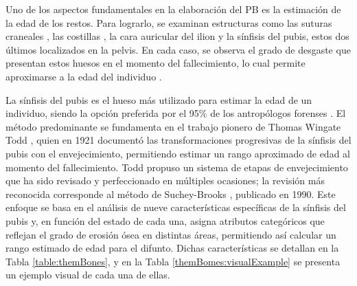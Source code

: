 Uno de los aspectos fundamentales en la elaboración del PB es la estimación de la edad de los restos. Para lograrlo, se examinan estructuras como las suturas craneales \cite{skullAF}, las costillas \cite{icscan1984age}, la cara auricular del ilion \cite{buckberry_age_2002} y la sínfisis del pubis, estos dos últimos localizados en la pelvis. En cada caso, se observa el grado de desgaste que presentan estos huesos en el momento del fallecimiento, lo cual permite aproximarse a la edad del individuo \cite{RefWorks:RefID:12-black2011forensic}.

La sínfisis del pubis es el hueso más utilizado para estimar la edad de un individuo, siendo la opción preferida por el 95\% de los antropólogos forenses \cite{garvin_current_2012}. El método predominante se fundamenta en el trabajo pionero de Thomas Wingate Todd \cite{RefWorks:RefID:19-todd1921age}, quien en 1921 documentó las transformaciones progresivas de la sínfisis del pubis con el envejecimiento, permitiendo estimar un rango aproximado de edad al momento del fallecimiento. Todd propuso un sistema de etapas de envejecimiento que ha sido revisado y perfeccionado en múltiples ocasiones; la revisión más reconocida corresponde al método de Suchey-Brooks \cite{RefWorks:RefID:20-brooks1990skeletal}, publicado en 1990. Este enfoque se basa en el análisis de nueve características específicas de la sínfisis del pubis y, en función del estado de cada una, asigna atributos categóricos que reflejan el grado de erosión ósea en distintas áreas, permitiendo así calcular un rango estimado de edad para el difunto. Dichas características se detallan en la Tabla \ref{table:themBones}, y en la Tabla \ref{themBomes:visualExample} se presenta un ejemplo visual de cada una de ellas.

